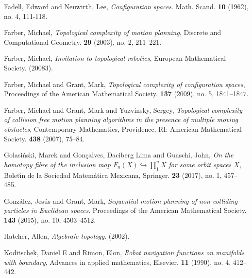 \documentclass{amsart}
\theoremstyle{definition}
\numberwithin{equation}{section}
\begin{document}

\begin{thebibliography}{10}

\smallskip
{} Fadell, Edward and Neuwirth, Lee, {\it Configuration spaces}. Math. Scand. {\bf 10} (1962), no. 4, 111-118.

\smallskip

 Farber, Michael, {\it Topological complexity of motion planning}, Discrete and Computational Geometry. {\bf 29} (2003), no. 2, 211--221.

\smallskip

 Farber, Michael, {\it Invitation to topological robotics}, European Mathematical Society. (20083).

\smallskip

 Farber, Michael and Grant, Mark, {\it Topological complexity of configuration spaces}, Proceedings of the American Mathematical Society. {\bf 137} (2009), no. 5, 1841--1847.    
\smallskip

 Farber, Michael and Grant, Mark and Yuzvinsky, Sergey, {\it Topological complexity of collision free motion planning algorithms in the presence of multiple moving obstacles}, Contemporary Mathematics, Providence, RI: American Mathematical Society. {\bf 438} (2007), 75--84.

\smallskip

 Golasi{\'n}ski, Marek and Gon{\c{c}}alves, Daciberg Lima and Guaschi, John, {\it On the homotopy fibre of the inclusion map $F_n (X)\hookrightarrow\prod_1^{n} X$ for some orbit spaces $X$}, Bolet{\'\i}n de la Sociedad Matem{\'a}tica Mexicana, Springer. {\bf 23} (2017), no. 1, 457--485.

\smallskip


 Gonz{\'a}lez, Jes{\'u}s and Grant, Mark, {\it Sequential motion planning of non-colliding particles in Euclidean spaces}. Proceedings of the American Mathematical Society. {\bf 143} (2015), no. 10, 4503--4512.

\smallskip

  Hatcher, Allen, {\it Algebraic topology}. (2002).

\smallskip

 Koditschek, Daniel E and Rimon, Elon, {\it Robot navigation functions on manifolds with boundary}, Advances in applied mathematics, Elsevier. {\bf 11} (1990), no. 4, 412--442.


\end{thebibliography}
\end{document}
